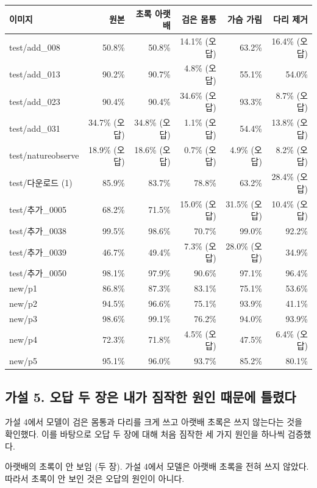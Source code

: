 \documentclass[11pt]{article}
\begin{document}
\begin{center}\footnotesize
\begin{tabular}{lrrrrr}
\toprule
이미지 & 원본 & 초록 아랫배 & 검은 몸통 & 가슴 가림 & 다리 제거 \\
\midrule
test/add\_008 & 50.8\% & 50.8\% & 14.1\% (오답) & 63.2\% & 16.4\% (오답) \\
test/add\_013 & 90.2\% & 90.7\% & 4.8\% (오답) & 55.1\% & 54.0\% \\
test/add\_023 & 90.4\% & 90.4\% & 34.6\% (오답) & 93.3\% & 8.7\% (오답) \\
test/add\_031 & 34.7\% (오답) & 34.8\% (오답) & 1.1\% (오답) & 54.4\% & 13.8\% (오답) \\
test/natureobserve & 18.9\% (오답) & 18.6\% (오답) & 0.7\% (오답) & 4.9\% (오답) & 8.2\% (오답) \\
test/다운로드 (1) & 85.9\% & 83.7\% & 78.8\% & 63.2\% & 28.4\% (오답) \\
test/추가\_0005 & 68.2\% & 71.5\% & 15.0\% (오답) & 31.5\% (오답) & 10.4\% (오답) \\
test/추가\_0038 & 99.5\% & 98.6\% & 70.7\% & 99.0\% & 92.2\% \\
test/추가\_0039 & 46.7\% & 49.4\% & 7.3\% (오답) & 28.0\% (오답) & 34.9\% \\
test/추가\_0050 & 98.1\% & 97.9\% & 90.6\% & 97.1\% & 96.4\% \\
new/p1 & 86.8\% & 87.3\% & 83.1\% & 75.1\% & 53.6\% \\
new/p2 & 94.5\% & 96.6\% & 75.1\% & 93.9\% & 41.1\% \\
new/p3 & 98.6\% & 99.1\% & 76.2\% & 94.0\% & 93.9\% \\
new/p4 & 72.3\% & 71.8\% & 4.5\% (오답) & 47.5\% & 6.4\% (오답) \\
new/p5 & 95.1\% & 96.0\% & 93.7\% & 85.2\% & 80.1\% \\
\bottomrule
\end{tabular}
\end{center}

\subsection*{가설 5. 오답 두 장은 내가 짐작한 원인 때문에 틀렸다}

가설 4에서 모델이 검은 몸통과 다리를 크게 쓰고 아랫배 초록은 쓰지 않는다는 것을 확인했다. 이를 바탕으로 오답 두 장에 대해 처음 짐작한 세 가지 원인을 하나씩 검증했다.

아랫배의 초록이 안 보임 (두 장). 가설 4에서 모델은 아랫배 초록을 전혀 쓰지 않았다. 따라서 초록이 안 보인 것은 오답의 원인이 아니다.
\end{document}
